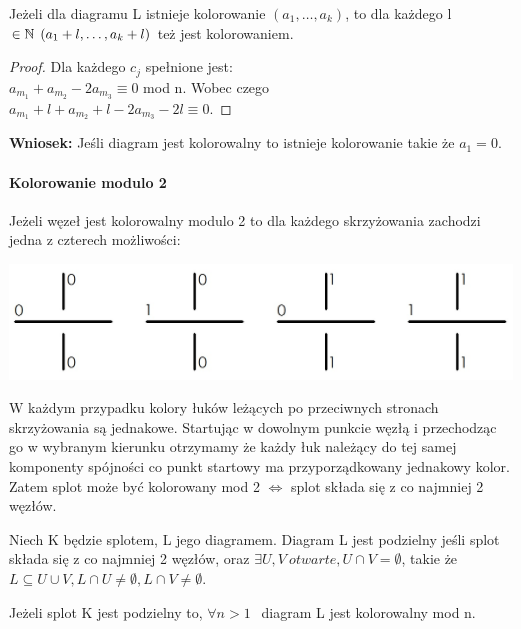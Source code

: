\begin{lemat}
Jeżeli dla diagramu L istnieje kolorowanie $( a_{1}, \ldots , a_{k} )$, to dla każdego l $\in \mathbb N\:\: ( a_{1}+l, \ldots , a_{k}+l )$ też jest kolorowaniem.
\end{lemat}
\begin{proof}
Dla każdego $c_{j}$ spełnione jest:\\
$a_{m_{1}}+a_{m_{2}}-2a_{m_{3}} \equiv 0$ mod n. Wobec czego \\ 
$a_{m_{1}}+l+a_{m_{2}}+l-2a_{m_{3}}-2l \equiv 0$.
\end{proof}
\textbf{Wniosek:} Jeśli diagram jest kolorowalny to istnieje kolorowanie takie że $a_{1} = 0$.

\paragraph{Kolorowanie modulo 2} Jeżeli węzeł jest kolorowalny modulo 2 to dla każdego skrzyżowania zachodzi jedna z czterech możliwości:
	\begin{center}
			\includegraphics[scale=0.3]{2/Obrazy/Mod2}
	\end{center}
	W każdym przypadku kolory łuków leżących po przeciwnych stronach skrzyżowania są jednakowe. Startując w dowolnym punkcie węzłą i przechodząc go w wybranym kierunku otrzymamy że każdy łuk należący do tej samej komponenty spójności co punkt startowy ma przyporządkowany jednakowy kolor. Zatem splot może być kolorowany mod 2 $\Leftrightarrow$ splot składa się z co najmniej 2 węzłów.
	
	\begin{definicja}
	Niech K będzie splotem, L jego diagramem. Diagram L jest podzielny jeśli splot składa się z co najmniej 2 węzłów, oraz  $\exists U, V\:  otwarte, U \cap V = \emptyset$, takie że $ L\subseteq U\cup V, L\cap U \neq \emptyset, L\cap V \neq \emptyset$.
	\end{definicja}
	
	
\begin{lemat}
	Jeżeli splot K jest podzielny to, $\forall n >1 \:\:$ diagram L jest kolorowalny mod n.
\end{lemat}
	
